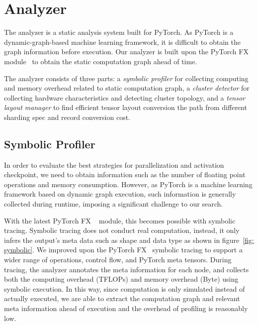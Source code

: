 \section{Analyzer}

The analyzer is a static analysis system built for PyTorch. As PyTorch is a dynamic-graph-based machine learning framework, it is difficult to obtain the graph information before execution. Our analyzer is built upon the PyTorch FX module~\cite{torch-fx} to obtain the static computation graph ahead of time. 

The analyzer consists of three parts: a \textit{symbolic profiler} for collecting computing and memory overhead related to static computation graph, a \textit{cluster detector} for collecting hardware characteristics and detecting cluster topology, and a \textit{tensor layout manager} to find efficient tensor layout conversion the path from different sharding spec and record conversion cost.\par

\subsection{Symbolic Profiler}


In order to evaluate the best strategies for parallelization and activation checkpoint, we need to obtain information such as the number of floating point operations and memory consumption. However, as PyTorch is a machine learning framework based on dynamic graph execution, such information is generally collected during runtime, imposing a significant challenge to our search.

With the latest PyTorch FX ~\cite{torch-fx} module, this becomes possible with symbolic tracing. Symbolic tracing does not conduct real computation, instead, it only infers the output's meta data such as shape and data type as shown in figure~\ref{fig: symbolic}. We improved upon the PyTorch FX~\cite{torch-fx} symbolic tracing to support a wider range of operations, control flow, and PyTorch meta tensors. During tracing, the analyzer annotates the meta information for each node, and collects both the computing overhead (TFLOPs) and memory overhead (Byte) using symbolic execution.
In this way, since computation is only simulated instead of actually executed, we are able to extract the computation graph and relevant meta information ahead of execution and the overhead of profiling is reasonably low.


